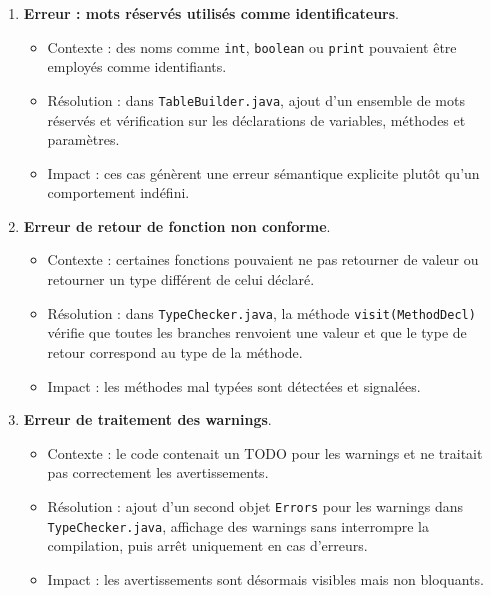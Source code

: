 \documentclass[a4paper,11pt]{article}
\begin{document}
\begin{enumerate}[label=\arabic*)]
  \item \textbf{Erreur : mots réservés utilisés comme identificateurs}.
  \begin{itemize}
    \item Contexte : des noms comme \texttt{int}, \texttt{boolean} ou \texttt{print} pouvaient être employés comme identifiants.
    \item Résolution : dans \texttt{TableBuilder.java}, ajout d'un ensemble de mots réservés et vérification sur les déclarations de variables, méthodes et paramètres.
    \item Impact : ces cas génèrent une erreur sémantique explicite plutôt qu'un comportement indéfini.
  \end{itemize}

  \item \textbf{Erreur de retour de fonction non conforme}.
  \begin{itemize}
    \item Contexte : certaines fonctions pouvaient ne pas retourner de valeur ou retourner un type différent de celui déclaré.
    \item Résolution : dans \texttt{TypeChecker.java}, la méthode \texttt{visit(MethodDecl)} vérifie que toutes les branches renvoient une valeur et que le type de retour correspond au type de la méthode.
    \item Impact : les méthodes mal typées sont détectées et signalées.
  \end{itemize}

  \item \textbf{Erreur de traitement des warnings}.
  \begin{itemize}
    \item Contexte : le code contenait un TODO pour les warnings et ne traitait pas correctement les avertissements.
    \item Résolution : ajout d'un second objet \texttt{Errors} pour les warnings dans \texttt{TypeChecker.java}, affichage des warnings sans interrompre la compilation, puis arrêt uniquement en cas d'erreurs.
    \item Impact : les avertissements sont désormais visibles mais non bloquants.
  \end{itemize}
\end{enumerate}
\end{document}
